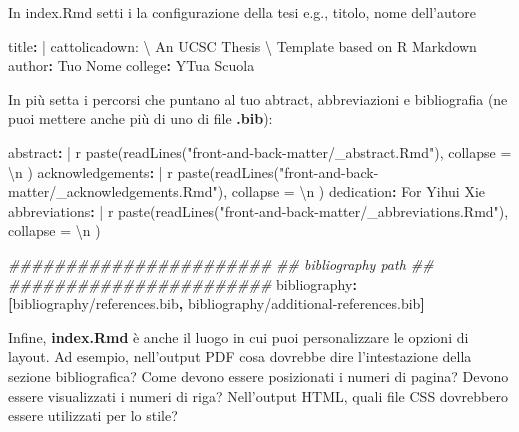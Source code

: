 \documentclass[a4paper, 11pt, nobind]{templates/ociamthesis}
\newenvironment{Shaded}{\begin{snugshade}}{\end{snugshade}}
\newcommand{\AttributeTok}[1]{\textcolor[rgb]{0.77,0.63,0.00}{#1}}
\newcommand{\CharTok}[1]{\textcolor[rgb]{0.31,0.60,0.02}{#1}}
\newcommand{\CommentTok}[1]{\textcolor[rgb]{0.56,0.35,0.01}{\textit{#1}}}
\newcommand{\FunctionTok}[1]{\textcolor[rgb]{0.00,0.00,0.00}{#1}}
\newcommand{\KeywordTok}[1]{\textcolor[rgb]{0.13,0.29,0.53}{\textbf{#1}}}
\newcommand{\NormalTok}[1]{#1}
\renewenvironment{Shaded}
{
  \vspace{10pt}%
  \begin{snugshade}%
}{%
  \end{snugshade}%
  \vspace{8pt}%
}
\begin{document}
In index.Rmd setti i la configurazione della tesi e.g., titolo, nome dell'autore

\begin{Shaded}
\begin{Highlighting}[]
\FunctionTok{title}\KeywordTok{: }\CharTok{|}
\NormalTok{  \textasciigrave{}cattolicadown\textasciigrave{}: \textbackslash{}}
\NormalTok{  An UCSC Thesis \textbackslash{}}
\NormalTok{  Template based on R Markdown}
\FunctionTok{author}\KeywordTok{:}\AttributeTok{ Tuo Nome}
\FunctionTok{college}\KeywordTok{:}\AttributeTok{ YTua Scuola}
\end{Highlighting}
\end{Shaded}

In più setta i percorsi che puntano al tuo abtract, abbreviazioni e bibliografia (ne puoi mettere anche più di uno di file \textbf{.bib}):

\begin{Shaded}
\begin{Highlighting}[]
\FunctionTok{abstract}\KeywordTok{: }\CharTok{|}
\NormalTok{  \textasciigrave{}r paste(readLines("front{-}and{-}back{-}matter/\_abstract.Rmd"), collapse = \textquotesingle{}\textbackslash{}n  \textquotesingle{})\textasciigrave{}}
\FunctionTok{acknowledgements}\KeywordTok{: }\CharTok{|}
\NormalTok{  \textasciigrave{}r paste(readLines("front{-}and{-}back{-}matter/\_acknowledgements.Rmd"), collapse = \textquotesingle{}\textbackslash{}n  \textquotesingle{})\textasciigrave{}}
\FunctionTok{dedication}\KeywordTok{:}\AttributeTok{ For Yihui Xie}
\FunctionTok{abbreviations}\KeywordTok{: }\CharTok{|}
\NormalTok{  \textasciigrave{}r paste(readLines("front{-}and{-}back{-}matter/\_abbreviations.Rmd"), collapse = \textquotesingle{}\textbackslash{}n  \textquotesingle{})\textasciigrave{}}

\CommentTok{\#\#\#\#\#\#\#\#\#\#\#\#\#\#\#\#\#\#\#\#\#\#\#}
\CommentTok{\#\# bibliography path \#\#}
\CommentTok{\#\#\#\#\#\#\#\#\#\#\#\#\#\#\#\#\#\#\#\#\#\#\#}
\FunctionTok{bibliography}\KeywordTok{:}\AttributeTok{ }\KeywordTok{[}\AttributeTok{bibliography/references.bib}\KeywordTok{,}\AttributeTok{ bibliography/additional{-}references.bib}\KeywordTok{]}
\end{Highlighting}
\end{Shaded}

Infine, \textbf{index.Rmd} è anche il luogo in cui puoi personalizzare le opzioni di layout.
Ad esempio, nell'output PDF cosa dovrebbe dire l'intestazione della sezione bibliografica?
Come devono essere posizionati i numeri di pagina?
Devono essere visualizzati i numeri di riga?
Nell'output HTML, quali file CSS dovrebbero essere utilizzati per lo stile?
\end{document}
